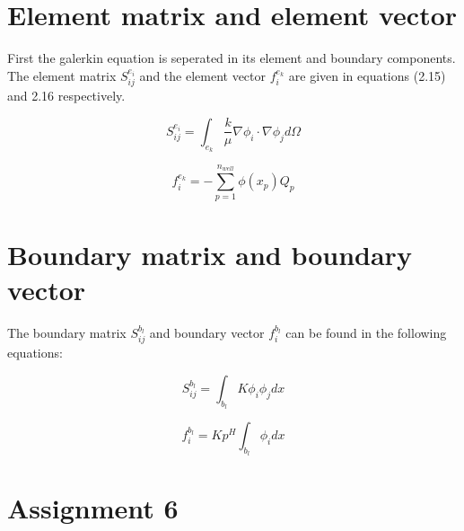 \documentclass{report}
\begin{document}
\section{Element matrix and element vector}

First the galerkin equation is seperated in its element and boundary components. The element matrix $S^{e_i}_{ij}$ and the element vector $f^{e_k}_i$ are given in equations (2.15) and 2.16 respectively.

\begin{equation}
	S^{e_i}_{ij} = \int_{e_k}\frac{k}{\mu}\nabla\phi_i\cdot\nabla \phi_j d\Omega
\end{equation}

\begin{equation}
	f^{e_k}_i =  -\sum_{p=1}^{n_{well}}\phi(x_p) Q_p
\end{equation}


\section{Boundary matrix and boundary vector}

The boundary matrix $S^{b_l}_{ij}$ and boundary vector $f^{b_l}_i$ can be found in the following equations:

\begin{equation}
	S^{b_l}_{ij} = \int_{b_l} K\phi_i \phi_j dx
\end{equation}

\begin{equation}
	f^{b_l}_i = Kp^H\int_{b_l}\phi_i dx
\end{equation}


\section{Assignment 6}




\end{document}
